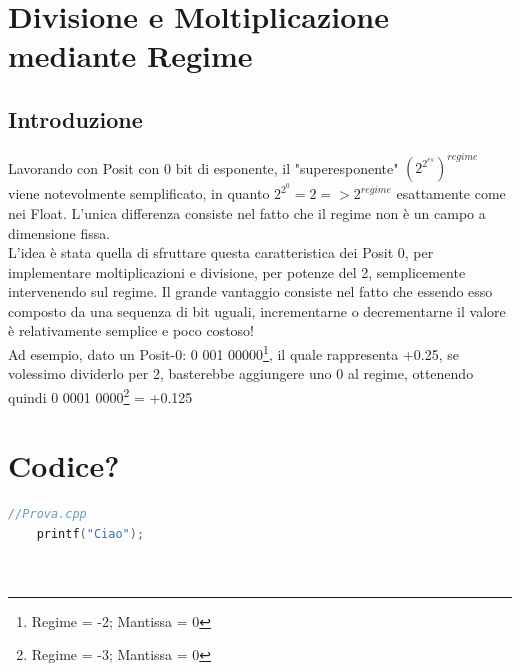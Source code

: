 \documentclass[a4paper,11pt]{article}
\begin{document}
\newpage
\section{Divisione e Moltiplicazione mediante Regime}
\subsection{Introduzione}

Lavorando con Posit con 0 bit di esponente, il "superesponente" $(2^{2^{es}})^{regime}$ viene notevolmente semplificato, in quanto $2^{2^{0}} = 2 => 2^{regime} $ esattamente come nei Float. L'unica differenza consiste nel fatto che il regime non è un campo a dimensione fissa.\\ L'idea è stata quella di sfruttare questa caratteristica dei Posit 0, per implementare moltiplicazioni e divisione, per potenze del 2, semplicemente intervenendo sul regime. Il grande vantaggio consiste nel fatto che essendo esso composto da una sequenza di bit uguali, incrementarne o decrementarne il valore è relativamente semplice e poco costoso!\\
Ad esempio, dato un Posit-0: 0 001 00000\footnote{Regime = -2; Mantissa = 0}, il quale rappresenta +0.25, se volessimo dividerlo per 2, basterebbe aggiungere uno 0 al regime, ottenendo quindi 0 0001 0000\footnote{Regime = -3; Mantissa = 0} = +0.125


\section{Codice?}

\begin{lstlisting}[language=C++]
	//Prova.cpp
	printf("Ciao");
	
	
\end{lstlisting}
\newpage




	\nocite{articolo1}
	
	\printbibliography[title=Bibliografia]

	
\end{document}
